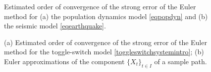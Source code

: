 \documentclass[reqno,12pt]{amsart}
\theoremstyle{plain} %
\theoremstyle{definition} %
\begin{document}
\begin{figure}[htb]
    \caption{Estimated order of convergence of the strong error of the Euler method for (a) the population dynamics model \cref{eqpopdyn} and (b) the seismic model \cref{eqearthquake}.}
    \label{figallcombinedpopdynrisk}
\end{figure}

\begin{figure}[htb]
    \caption{(a) Estimated order of convergence of the strong error of the Euler method for the toggle-switch model \cref{toggleswitchsystemintro}; (b) Euler approximations of the component $\{X_t\}_{t\in I}$ of a sample path.}
    \label{figtoggleswitchintro}
\end{figure}
\end{document}
